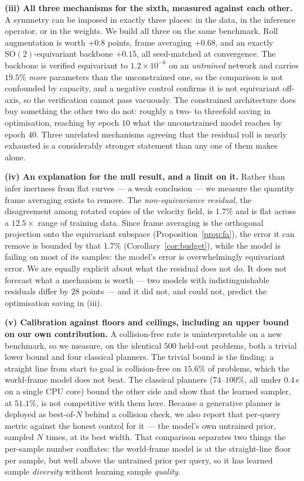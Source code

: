\documentclass[10pt,twocolumn,letterpaper]{article}
\theoremstyle{plain}
\begin{document}
\textbf{(iii) All three mechanisms for the sixth, measured against each other.}
A symmetry can be imposed in exactly three places: in the data, in the inference
operator, or in the weights. We build all three on the same benchmark. Roll
augmentation is worth $+0.8$ points, frame averaging $+0.68$, and an exactly
$\mathrm{SO}(2)$-equivariant backbone $+0.15$, all seed-matched at convergence.
The backbone is verified equivariant to $1.2\times10^{-6}$ on an \emph{untrained}
network and carries $19.5\%$ \emph{more} parameters than the unconstrained one,
so the comparison is not confounded by capacity, and a negative control confirms
it is not equivariant off-axis, so the verification cannot pass vacuously. The
constrained architecture does buy something the other two do not: roughly a
two- to threefold saving in optimisation, reaching by epoch $10$ what the unconstrained
model reaches by epoch $40$. Three unrelated mechanisms agreeing that the residual
roll is nearly exhausted is a considerably stronger statement than any one of
them makes alone.

\textbf{(iv) An explanation for the null result, and a limit on it.} Rather than
infer inertness from flat curves --- a weak conclusion --- we measure the
quantity frame averaging exists to remove. The \emph{non-equivariance residual},
the disagreement among rotated copies of the velocity field, is $1.7\%$ and is
flat across a $12.5\times$ range of training data. Since frame averaging is the
orthogonal projection onto the equivariant subspace (Proposition~\ref{prop:fa}),
the error it can remove is bounded by that $1.7\%$ (Corollary~\ref{cor:budget}),
while the model is failing on most of its samples: the model's error is
overwhelmingly equivariant error. We are equally explicit about what the residual
does not do. It does not forecast what a mechanism is worth --- two models with
indistinguishable residuals differ by $28$ points --- and it did not, and could
not, predict the optimisation saving in (iii).

\textbf{(v) Calibration against floors and ceilings, including an upper bound on
our own contribution.} A collision-free rate is
uninterpretable on a new benchmark, so we measure, on the identical $500$ held-out
problems, both a trivial lower bound and four classical planners. The trivial
bound is the finding: a straight line from start to goal is collision-free on
$15.6\%$ of problems, which the world-frame model does not beat. The
classical planners ($74$--$100\%$, all under $0.4$\,s on a single CPU core) bound
the other side and show that the learned sampler, at $51.1\%$, is not competitive
with them here. Because a generative planner is deployed as best-of-$N$ behind a
collision check, we also report that per-query metric against the honest control
for it --- the model's own untrained prior, sampled $N$ times, at its best width.
That comparison separates two things the per-sample number conflates: the
world-frame model is at the straight-line floor per sample, but well above the
untrained prior per query, so it has learned sample \emph{diversity} without
learning sample \emph{quality}.
\end{document}
